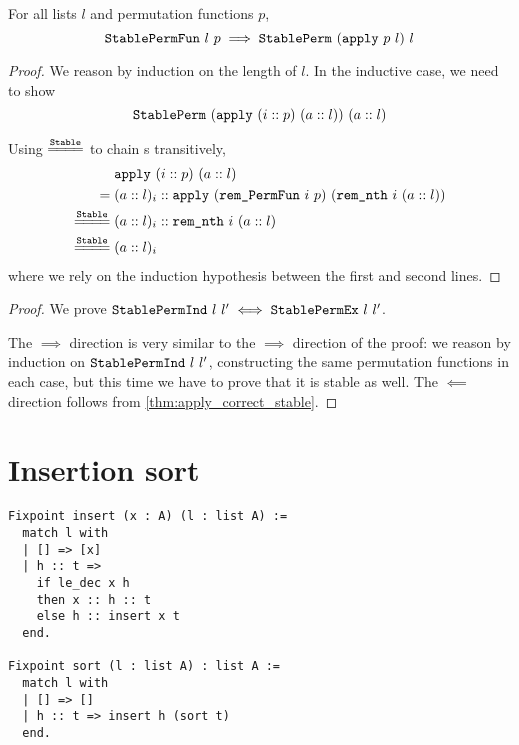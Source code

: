 \documentclass[sigplan,10pt,anonymous,review]{thesis}
\begin{document}
\begin{theorem}
  \label{thm:apply_correct_stable}
  For all lists $l$ and permutation functions $p$,
  \begin{equation*}
    \texttt{\textup{StablePermFun}}~l~p \implies \texttt{\textup{StablePerm}}~(\texttt{\textup{apply}}~p~l)~l
  \end{equation*}
\end{theorem}
\begin{proof}
  We reason by induction on the length of $l$. In the inductive case,
  we need to show
  \begin{equation*}
    \texttt{\textup{StablePerm}}~(\texttt{\textup{apply}}~(i :: p)~(a :: l))~(a :: l)
  \end{equation*}

  Using $\eqstable$ to chain s transitively,
  \begin{align*}
    {}& \var{apply}~(i :: p)~(a :: l) \\
    ={}& (a :: l)_i  ::
    \var{apply}~(\var{rem\_PermFun}~i~p)~(\var{rem\_nth}~i~(a :: l)) \\
    \eqstable{}& (a :: l)_i :: \var{rem\_nth}~i~(a :: l) \\
    \eqstable{}& (a :: l)_i
  \end{align*}
  where we rely on the induction hypothesis between the first and
  second lines.
\end{proof}

\stablepermexiff*
\begin{proof}
  We prove $\texttt{\textup{StablePermInd}}~l~l' \iff \texttt{\textup{StablePermEx}}~l~l'$.

  The $\implies$ direction is very similar to the $\implies$ direction
  of the  proof: we reason by induction on
  $\texttt{\textup{StablePermInd}}~l~l'$, constructing the same permutation
  functions in each case, but this time we have to prove that it is
  stable as well. The $\impliedby$ direction follows from
  \cref{thm:apply_correct_stable}.
\end{proof}

\section{Insertion sort}
\label{appendix:insertion_sort}

\begin{lstlisting}
Fixpoint insert (x : A) (l : list A) :=
  match l with
  | [] => [x]
  | h :: t =>
    if le_dec x h
    then x :: h :: t
    else h :: insert x t
  end.

Fixpoint sort (l : list A) : list A :=
  match l with
  | [] => []
  | h :: t => insert h (sort t)
  end.
\end{lstlisting}
\end{document}
